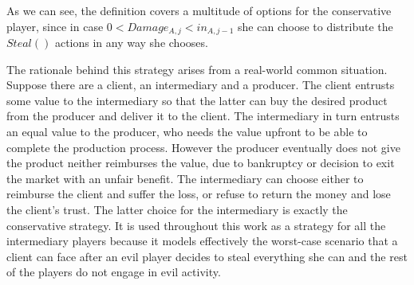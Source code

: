 \documentclass[11pt]{llncs}
\theoremstyle{definition}
\begin{document}
     As we can see, the definition covers a multitude of options for the conservative player, since in case $0 < Damage_{A,j}
     < in_{A,j-1}$ she can choose to distribute the $Steal\left(\right)$ actions in any way she chooses.

     The rationale behind this strategy arises from a real-world common situation. Suppose there are a client, an
     intermediary and a producer. The client entrusts some value to the intermediary so that the latter can buy the desired
     product from the producer and deliver it to the client. The intermediary in turn entrusts an equal value to the
     producer, who needs the value upfront to be able to complete the production process. However the producer eventually
     does not give the product neither reimburses the value, due to bankruptcy or decision to exit the market with an unfair
     benefit. The intermediary can choose either to reimburse the client and suffer the loss, or refuse to return the money
     and lose the client's trust. The latter choice for the intermediary is exactly the conservative strategy. It is used
     throughout this work as a strategy for all the intermediary players because it models effectively the worst-case
     scenario that a client can face after an evil player decides to steal everything she can and the rest of the players do
     not engage in evil activity.
\end{document}
